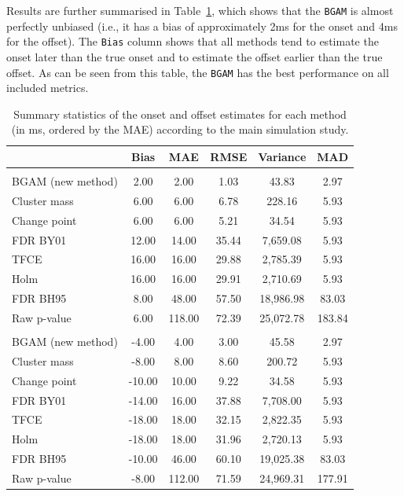 \documentclass[
  doc,
  floatsintext,
  longtable,
  a4paper,
  nolmodern,
  notxfonts,
  notimes,
  donotrepeattitle,
  colorlinks=true,linkcolor=blue,citecolor=blue,urlcolor=blue]{apa7}
\begin{document}
Results are further summarised in Table~\ref{tbl-simulation-results},
which shows that the \texttt{BGAM} is almost perfectly unbiased (i.e.,
it has a bias of approximately 2ms for the onset and 4ms for the
offset). The \texttt{Bias} column shows that all methods tend to
estimate the onset later than the true onset and to estimate the offset
earlier than the true offset. As can be seen from this table, the
\texttt{BGAM} has the best performance on all included metrics.

\begin{table}

{\caption{{Summary statistics of the onset and offset estimates for each
method (in ms, ordered by the MAE) according to the main simulation
study.}{\label{tbl-simulation-results}}}}

\fontsize{9.0pt}{10.8pt}\selectfont
\begin{tabular*}{\linewidth}{@{\extracolsep{\fill}}lccccc}
\toprule
 & Bias & MAE & RMSE & Variance & MAD \\ 
\midrule\addlinespace[2.5pt]
\multicolumn{6}{l}{onset} \\[2.5pt] 
\midrule\addlinespace[2.5pt]
BGAM (new method) & 2.00 & 2.00 & 1.03 & 43.83 & 2.97 \\ 
Cluster mass & 6.00 & 6.00 & 6.78 & 228.16 & 5.93 \\ 
Change point & 6.00 & 6.00 & 5.21 & 34.54 & 5.93 \\ 
FDR BY01 & 12.00 & 14.00 & 35.44 & 7,659.08 & 5.93 \\ 
TFCE & 16.00 & 16.00 & 29.88 & 2,785.39 & 5.93 \\ 
Holm & 16.00 & 16.00 & 29.91 & 2,710.69 & 5.93 \\ 
FDR BH95 & 8.00 & 48.00 & 57.50 & 18,986.98 & 83.03 \\ 
Raw p-value & 6.00 & 118.00 & 72.39 & 25,072.78 & 183.84 \\ 
\midrule\addlinespace[2.5pt]
\multicolumn{6}{l}{offset} \\[2.5pt] 
\midrule\addlinespace[2.5pt]
BGAM (new method) & -4.00 & 4.00 & 3.00 & 45.58 & 2.97 \\ 
Cluster mass & -8.00 & 8.00 & 8.60 & 200.72 & 5.93 \\ 
Change point & -10.00 & 10.00 & 9.22 & 34.58 & 5.93 \\ 
FDR BY01 & -14.00 & 16.00 & 37.88 & 7,708.00 & 5.93 \\ 
TFCE & -18.00 & 18.00 & 32.15 & 2,822.35 & 5.93 \\ 
Holm & -18.00 & 18.00 & 31.96 & 2,720.13 & 5.93 \\ 
FDR BH95 & -10.00 & 46.00 & 60.10 & 19,025.38 & 83.03 \\ 
Raw p-value & -8.00 & 112.00 & 71.59 & 24,969.31 & 177.91 \\ 
\bottomrule
\end{tabular*}

\end{table}
\end{document}

